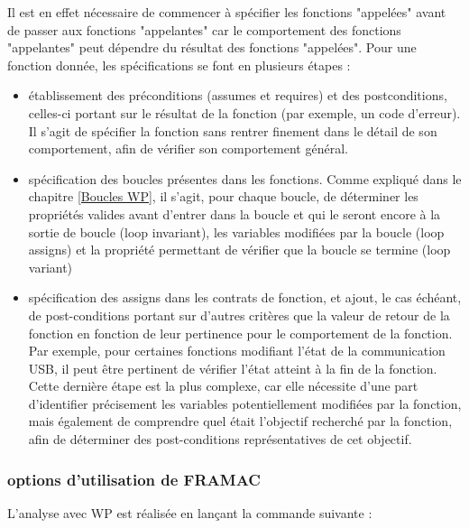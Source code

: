Il est en effet nécessaire de commencer à spécifier les fonctions "appelées" avant de passer aux fonctions "appelantes" car le comportement des fonctions "appelantes" peut dépendre du résultat des fonctions "appelées".
\newline \noindent
Pour une fonction donnée, les spécifications se font en plusieurs étapes :
\begin{itemize}
	\item établissement des préconditions (assumes et requires) et des postconditions, celles-ci portant sur le résultat de la fonction (par exemple, un code d'erreur). Il s'agit de spécifier la fonction sans rentrer finement dans le détail de son comportement, afin de vérifier son comportement général.
	\item spécification des boucles présentes dans les fonctions. Comme expliqué dans le chapitre \ref{Boucles WP}, il s'agit, pour chaque boucle, de déterminer les propriétés valides avant d'entrer dans la boucle et qui le seront encore à la sortie de boucle (loop invariant), les variables modifiées par la boucle (loop assigns) et la propriété permettant de vérifier que la boucle se termine (loop variant)
	\item spécification des assigns dans les contrats de fonction, et ajout, le cas échéant, de post-conditions portant sur d'autres critères que la valeur de retour de la fonction en fonction de leur pertinence pour le comportement de la fonction. Par exemple, pour certaines fonctions modifiant l'état de la communication USB, il peut être pertinent de vérifier l'état atteint à la fin de la fonction. Cette dernière étape est la plus complexe, car elle nécessite d'une part d'identifier précisement les variables potentiellement modifiées par la fonction, mais également de comprendre quel était l'objectif recherché par la fonction, afin de déterminer des post-conditions représentatives de cet objectif.
\end{itemize}


\subsubsection{options d'utilisation de FRAMAC}\label{options pour WP}

L'analyse avec WP est réalisée en lançant la commande suivante :

